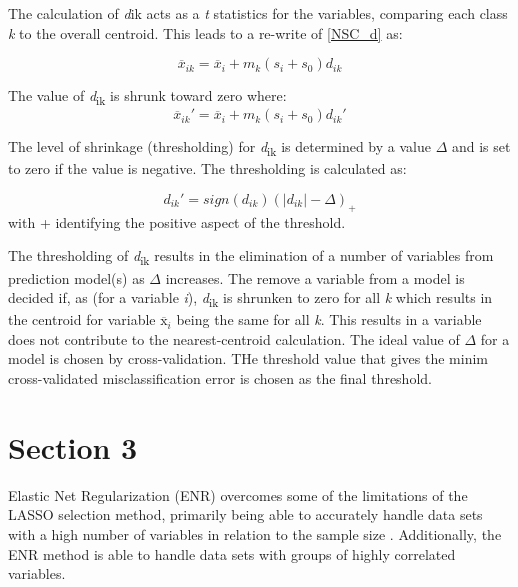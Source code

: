The calculation of \textit{d}ik acts as a \textit{t} statistics for the variables, comparing each class \textit{k} to the overall centroid. This leads to a re-write of \ref{NSC_d} as:

\begin{equation} \label{NSC_drw}
\overline{x}_{ik} = \overline{x}_i + m_k (s_i + s_0)d_{ik}
\end{equation}

The value of \textit{d}\textsubscript{ik} is shrunk toward zero where:
\begin{equation} \label{NSC_drw_shrunk}
\overline{x}_{ik}' = \overline{x}_i + m_k (s_i + s_0)d_{ik}'
\end{equation}

The level of shrinkage (thresholding) for \textit{d}\textsubscript{ik} is determined by a value $\Delta$ and is set to zero if the value is negative. The thresholding is calculated as:

\begin{equation} \label{NSC_threshold}
d_{ik}' = sign(d_{ik})(|d_{ik}| - \Delta)_+
\end{equation}
with + identifying the positive aspect of the threshold.

The thresholding of \textit{d}\textsubscript{ik} results in the elimination of a number of variables from prediction model(s) as $\Delta$ increases. The remove a variable from a model is decided if, as (for a variable \textit{i}), \textit{d}\textsubscript{ik} is shrunken to zero for all \textit{k} which results in the centroid for variable $\overline{\mbox{x}}_i$ being the same for all \textit{k}. This results in a variable does not contribute to the nearest-centroid calculation. The ideal value of $\Delta$ for a model is chosen by cross-validation. THe threshold value that gives the minim cross-validated misclassification error is chosen as the final threshold.

\section{Section 3}\label{Elasitc Net Regularization}
Elastic Net Regularization (ENR) overcomes some of the limitations of the LASSO selection method, primarily being able to accurately handle data sets with a high number of variables in relation to the sample size \cite{tibshirani1996regression,efron2004least}. Additionally, the ENR method is able to handle data sets with groups of highly correlated variables. 

